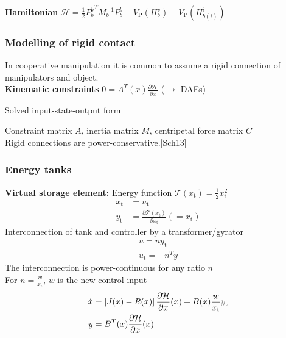 \documentclass[student]{ITRslides}
\newcommand{\g}[1]{\text{#1}}
\begin{document}
\begin{frame}
{	\begin{figure}
		
		\def\svgwidth{0.4\columnwidth}
		
	\end{figure}
	\textbf{Hamiltonian} $\mathcal{H}= \frac{1}{2} {P_b^b}^T M_b^{-1} P_b^b + V_\g{P}(H_b^v) + V_\g{P}(H_{b(i)}^i)$}
	
\end{frame}

\begin{frame}
	\frametitle{Modelling of rigid contact}
	In cooperative manipulation it is common to assume a rigid connection of manipulators and object. \\
	\textbf{Kinematic constraints} $ 0 = A^T(x)\frac{\partial \mathcal{H}}{\partial x}$ ($\rightarrow$ DAEs)\\
	
	\begin{block}{Solved input-state-output form}
	\end{block}
	Constraint matrix $A$, inertia matrix $M$, centripetal force matrix $C$ \\
	\vspace{6pt}
Rigid connections are power-conservative.\nocite{Schaft_13}{\tiny [Sch13]}

\end{frame}


\begin{frame}
	\frametitle{Energy tanks}
	\textbf{Virtual storage element:} Energy function $\mathcal{T}(x_\g{t}) = \frac{1}{2}x_\g{t}^2$
	\begin{align*}
	x_\g{t} &= u_\g{t} \\
	y_\g{t} &= \frac{\partial \mathcal{T}(x_\g{t})}{\partial x_\g{t}} (=x_\g{t})
	\end{align*}
	Interconnection of tank and controller by a transformer/gyrator
	\begin{align*}
		u = ny_\g{t}\\
		u_\g{t} = -n^T y
	\end{align*}
	The interconnection is power-continuous for any ratio $n$\\
	For $ n = \frac{w}{x_\g{t}}$, $w$ is the new control input
	\begin{align*}
	\dot{x} &= \left[J(x)-R(x)\right]\frac{\partial \mathcal{H}}{\partial x}(x) +B(x)\frac{w}{\color{gray}{x_\g{t}}}{\color{gray}y_\g{t}} \\
	y &= B^T(x)\frac{\partial \mathcal{H}}{\partial x}(x)
	\end{align*} 
\end{frame}
\end{document}
